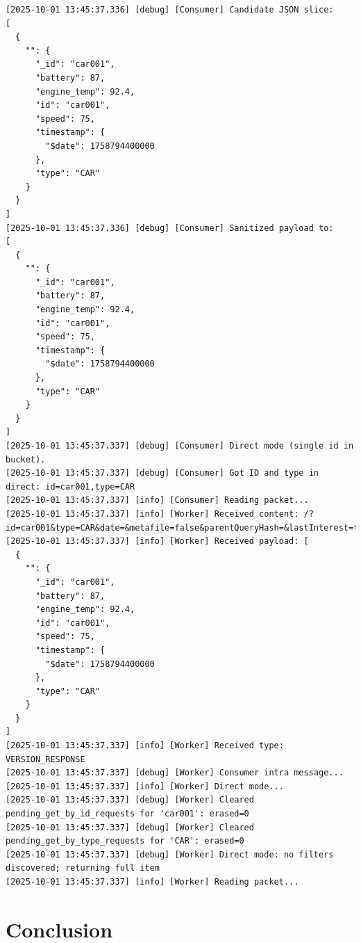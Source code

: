 \documentclass{article}
\begin{document}
\begin{lstlisting}[language=log, caption={Logs of the SeEDS Service of the \emph{UMemphis} node, after getting a response from \emph{GET by TYPE}}, label={lst:get-by-type-umemphis}]
[2025-10-01 13:45:37.336] [debug] [Consumer] Candidate JSON slice:
[
  {
    "": {
      "_id": "car001",
      "battery": 87,
      "engine_temp": 92.4,
      "id": "car001",
      "speed": 75,
      "timestamp": {
        "$date": 1758794400000
      },
      "type": "CAR"
    }
  }
]
[2025-10-01 13:45:37.336] [debug] [Consumer] Sanitized payload to:
[
  {
    "": {
      "_id": "car001",
      "battery": 87,
      "engine_temp": 92.4,
      "id": "car001",
      "speed": 75,
      "timestamp": {
        "$date": 1758794400000
      },
      "type": "CAR"
    }
  }
]
[2025-10-01 13:45:37.337] [debug] [Consumer] Direct mode (single id in bucket).
[2025-10-01 13:45:37.337] [debug] [Consumer] Got ID and type in direct: id=car001,type=CAR
[2025-10-01 13:45:37.337] [info] [Consumer] Reading packet...
[2025-10-01 13:45:37.337] [info] [Worker] Received content: /?id=car001&type=CAR&date=&metafile=false&parentQueryHash=&lastInterest=true&mode=direct
[2025-10-01 13:45:37.337] [info] [Worker] Received payload: [
  {
    "": {
      "_id": "car001",
      "battery": 87,
      "engine_temp": 92.4,
      "id": "car001",
      "speed": 75,
      "timestamp": {
        "$date": 1758794400000
      },
      "type": "CAR"
    }
  }
]
[2025-10-01 13:45:37.337] [info] [Worker] Received type: VERSION_RESPONSE
[2025-10-01 13:45:37.337] [debug] [Worker] Consumer intra message...
[2025-10-01 13:45:37.337] [info] [Worker] Direct mode...
[2025-10-01 13:45:37.337] [debug] [Worker] Cleared pending_get_by_id_requests for 'car001': erased=0
[2025-10-01 13:45:37.337] [debug] [Worker] Cleared pending_get_by_type_requests for 'CAR': erased=0
[2025-10-01 13:45:37.337] [debug] [Worker] Direct mode: no filters discovered; returning full item
[2025-10-01 13:45:37.337] [info] [Worker] Reading packet...
\end{lstlisting}
\section{Conclusion}
\end{document}
